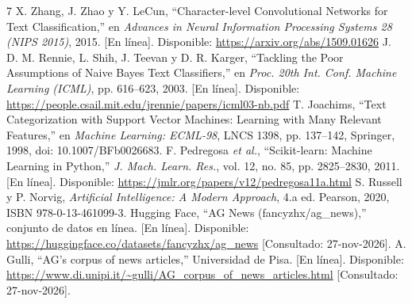 \documentclass[conference]{IEEEtran}
\begin{document}
\begin{thebibliography}{7}
 X. Zhang, J. Zhao y Y. LeCun, ``Character-level
Convolutional Networks for Text Classification,'' en
\emph{Advances in Neural Information Processing Systems 28
(NIPS 2015)}, 2015. [En línea]. Disponible:
\url{https://arxiv.org/abs/1509.01626}
 J. D. M. Rennie, L. Shih, J. Teevan y D. R. Karger,
``Tackling the Poor Assumptions of Naive Bayes Text Classifiers,''
en \emph{Proc. 20th Int. Conf. Machine Learning (ICML)},
pp. 616--623, 2003. [En línea]. Disponible:
\url{https://people.csail.mit.edu/jrennie/papers/icml03-nb.pdf}
 T. Joachims, ``Text Categorization with Support
Vector Machines: Learning with Many Relevant Features,'' en
\emph{Machine Learning: ECML-98}, LNCS 1398, pp. 137--142,
Springer, 1998, doi: 10.1007/BFb0026683.
 F. Pedregosa \emph{et al.},
``Scikit-learn: Machine Learning in Python,'' \emph{J. Mach.
Learn. Res.}, vol. 12, no. 85, pp. 2825--2830, 2011.
[En línea]. Disponible: \url{https://jmlr.org/papers/v12/pedregosa11a.html}
 S. Russell y P. Norvig,
\emph{Artificial Intelligence: A Modern Approach}, 4.a ed.
Pearson, 2020, ISBN 978-0-13-461099-3.
 Hugging Face, ``AG News (fancyzhx/ag\_news),''
conjunto de datos en línea. [En línea]. Disponible:
\url{https://huggingface.co/datasets/fancyzhx/ag_news}
[Consultado: 27-nov-2026].
 A. Gulli, ``AG's corpus of news articles,''
Universidad de Pisa. [En línea]. Disponible:
\url{https://www.di.unipi.it/~gulli/AG_corpus_of_news_articles.html}
[Consultado: 27-nov-2026].
\end{thebibliography}
\end{document}
